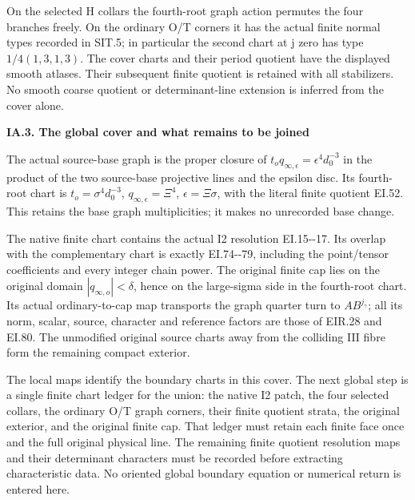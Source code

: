 On the selected H collars the fourth-root graph action permutes
the four branches freely. On the ordinary O/T corners it has the
actual finite normal types recorded in SIT.5; in particular the
second chart at j zero has type \(1/4(1,3,1,3)\). The cover
charts and their period quotient have the displayed smooth
atlases. Their subsequent finite quotient is retained with all
stabilizers. No smooth coarse quotient or determinant-line
extension is inferred from the cover alone.

\par

\medskip\noindent\textbf{IA.3. The global cover and what remains to be joined}

\par\nobreak

The actual source-base graph is the proper closure of
\(t_o q_{\infty,\epsilon}=\epsilon^4d_0^{-3}\) in the product
of the two source-base projective lines and the epsilon disc.
Its fourth-root chart is \(t_o=\sigma^4d_0^{-3}\),
\(q_{\infty,\epsilon}=\Xi^4\), \(\epsilon=\Xi\sigma\),
with the literal finite quotient EI.52. This retains the base
graph multiplicities; it makes no unrecorded base change.

The native finite chart contains the actual I2 resolution EI.15-\/-17.
Its overlap with the complementary chart is exactly EI.74-\/-79,
including the point/tensor coefficients and every integer chain
power. The original finite cap lies on the original domain
\(|q_{\infty,o}|<\delta\), hence on the large-sigma side in
the fourth-root chart. Its actual ordinary-to-cap map transports
the graph quarter turn to \(A B^{j_\gamma}\); all its norm,
scalar, source, character and reference factors are those of
EIR.28 and EI.80. The unmodified original source charts away
from the colliding III fibre form the remaining compact exterior.

The local maps identify the boundary charts in this cover. The
next global step is a single finite chart ledger for the union:
the native I2 patch, the four selected collars, the ordinary
O/T graph corners, their finite quotient strata, the original
exterior, and the original finite cap. That ledger must retain
each finite face once and the full original physical line.
The remaining finite quotient resolution maps and their
determinant characters must be recorded before extracting
characteristic data. No oriented global boundary equation or
numerical return is entered here.

\par

